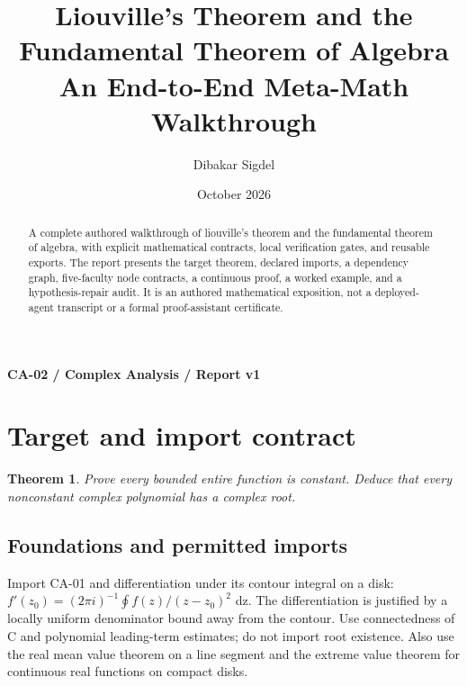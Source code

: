 \documentclass[preprint,12pt,aps,pra,showkeys,amsmath,amssymb,superscriptaddress,floatfix]{revtex4-2}
\newtheorem{theorem}{Theorem}[section]
\theoremstyle{definition}
\theoremstyle{remark}
\begin{document}
\title{Liouville's Theorem and the Fundamental Theorem of Algebra\\[4pt]\large An End-to-End Meta-Math Walkthrough}

\author{Dibakar Sigdel}


\date{October 2026}

\begin{abstract}

A complete authored walkthrough of liouville's theorem and the
fundamental theorem of algebra, with explicit mathematical contracts,
local verification gates, and reusable exports. The report presents the
target theorem, declared imports, a dependency graph, five-faculty node
contracts, a continuous proof, a worked example, and a hypothesis-repair
audit. It is an authored mathematical exposition, not a deployed-agent
transcript or a formal proof-assistant certificate.

\end{abstract}\maketitle\linespread{1.12}\selectfont

\noindent\textbf{CA-02 / Complex Analysis / Report v1}

\section{Target and import contract}

\begin{theorem}

Prove every bounded entire function is constant. Deduce that every
nonconstant complex polynomial has a complex root.

\end{theorem}

\subsection{Foundations and permitted imports}

Import CA-01 and differentiation under its contour integral on a disk:
\(f'(z_{0})=(2\pi i)^{-1}\oint f(z)/(z-z_{0})^{2}\) dz. The
differentiation is justified by a locally uniform denominator bound away
from the contour. Use connectedness of C and polynomial leading-term
estimates; do not import root existence. Also use the real mean value
theorem on a line segment and the extreme value theorem for continuous
real functions on compact disks.
\end{document}
